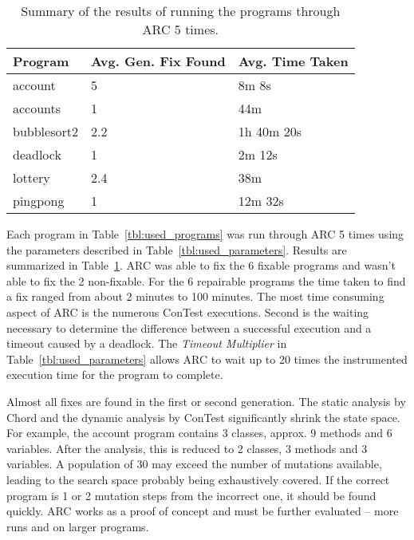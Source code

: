 \documentclass{llncs}
\begin{document}
\begin{table}[t!]
\caption{Summary of the results of running the programs through ARC 5 times.}
\begin{center}
\lstset{basicstyle=\scriptsize}
\begin{tabular}{|l|l|l|}
\hline
\textbf{Program} & 
\textbf{Avg. Gen. Fix Found} & 
\textbf{Avg. Time Taken} 
\\\hline
account & 5 & 8m 8s
\\\hline
accounts & 1 & 44m
\\\hline
bubblesort2 & 2.2 & 1h 40m 20s
\\\hline
deadlock & 1 & 2m 12s
\\\hline
lottery & 2.4 & 38m
\\\hline
pingpong & 1 & 12m 32s
\\\hline

\end{tabular}
\label{tbl:summary_results}
\end{center}
\end{table}

Each program in Table~\ref{tbl:used_programs} was run through ARC 5 times using the parameters described in Table~\ref{tbl:used_parameters}. Results are summarized in Table~\ref{tbl:summary_results}. ARC was able to fix the 6 fixable programs and wasn't able to fix the 2 non-fixable. For the 6 repairable programs the time taken to find a fix ranged from about 2 minutes to 100 minutes. The most time consuming aspect of ARC is the numerous ConTest executions. Second is the waiting necessary to determine the difference between a successful execution and a timeout caused by a deadlock. The \textit{Timeout Multiplier} in Table~\ref{tbl:used_parameters} allows ARC to wait up to 20 times the instrumented execution time for the program to complete.

Almost all fixes are found in the first or second generation.  The static analysis by Chord and the dynamic analysis by ConTest significantly shrink the state space.  For example, the account program contains 3 classes, approx. 9 methods and 6 variables.  After the analysis, this is reduced to 2 classes, 3 methods and 3 variables.  A population of 30 may exceed the number of mutations available, leading to the search space probably being exhaustively covered.  If the correct program is 1 or 2 mutation steps from the incorrect one, it should be found quickly.  ARC works as a proof of concept and must be further evaluated -- more runs and on larger programs.
\end{document}
